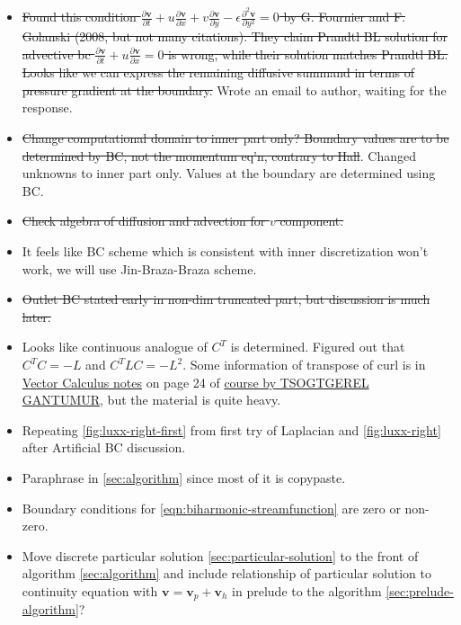\documentclass{article}
\numberwithin{equation}{section}
\begin{document}
{\begin{itemize}
    \item  \st{Found this condition $\frac{\partial \boldsymbol{v}}{\partial t}+u \frac{\partial \boldsymbol{v}}{\partial x}+v \frac{\partial \boldsymbol{v}}{\partial y}-\epsilon \frac{\partial^2 \boldsymbol{v}}{\partial y^2}=0$ by G. Fournier and F. Golanski (2008, but not many citations). They claim Prandtl BL solution for advective bc $\frac{\partial \boldsymbol{v}}{\partial t} + u\frac{\partial \boldsymbol{v}}{\partial x}=0$ is wrong, while their solution matches Prandtl BL. Looks like we can express the remaining diffusive summand in terms of pressure gradient at the boundary.} Wrote an email to author, waiting for the response. 
    \item \st{Change computational domain to inner part only? Boundary values are to be determined by BC, not the momentum eq'n, contrary to Hall}\cite{Hall:1980}. Changed unknowns to inner part only. Values at the boundary are determined using BC. 
    \item \st{Check algebra of diffusion and advection for $v$ component.} 
    \item It feels like BC scheme which is consistent with inner discretization won't work, we will use Jin-Braza-Braza scheme. 
    \item \st{Outlet BC stated early in non-dim truncated part, but discussion is much later.}
    \item Looks like continuous analogue of $C^T$ is determined. Figured out that $C^TC=-L$ and $C^TLC=-L^2$. Some information of transpose of curl is in \href{https://www.math.mcgill.ca/gantumur/math248f19/vectorcalc.pdf}{Vector Calculus notes} on page 24 of \href{https://www.math.mcgill.ca/gantumur/math248f19/}{course by TSOGTGEREL GANTUMUR}, but the material is quite heavy.
    \item Repeating \cref{fig:luxx-right-first} from first try of Laplacian and \cref{fig:luxx-right} after Artificial BC discussion.
    \item Paraphrase \cite{Gamtumur:2019} in \cref{sec:algorithm} since most of it is copypaste.
    \item Boundary conditions for \cref{eqn:biharmonic-streamfunction} are zero or non-zero.
    \item Move discrete particular solution \cref{sec:particular-solution} to the front of algorithm \cref{sec:algorithm} and include relationship of particular solution to continuity equation with $\boldsymbol{v}=\boldsymbol{v}_p+\boldsymbol{v}_h$ in prelude to the algorithm \cref{sec:prelude-algorithm}?

\end{itemize}}
\end{document}
